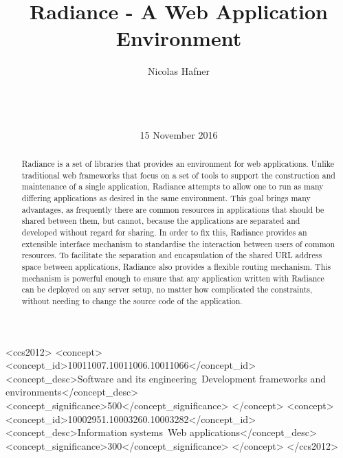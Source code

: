 \documentclass{sig-alternate}
\begin{document}
\doi{}
\isbn{}

\begin{CCSXML}
<ccs2012>
  <concept>
    <concept_id>10011007.10011006.10011066</concept_id>
    <concept_desc>Software and its engineering~Development frameworks and environments</concept_desc>
    <concept_significance>500</concept_significance>
  </concept>
  <concept>
    <concept_id>10002951.10003260.10003282</concept_id>
    <concept_desc>Information systems~Web applications</concept_desc>
    <concept_significance>300</concept_significance>
  </concept>
</ccs2012>
\end{CCSXML}


\title{Radiance - A Web Application Environment}

\author{
\alignauthor
Nicolas Hafner\\
       \\
       \\
       \\
}
\date{15 November 2016}

\maketitle

\begin{abstract}
  Radiance\cite{radiance} is a set of libraries that provides an environment for web applications. Unlike traditional web frameworks that focus on a set of tools to support the construction and maintenance of a single application, Radiance attempts to allow one to run as many differing applications as desired in the same environment. This goal brings many advantages, as frequently there are common resources in applications that should be shared between them, but cannot, because the applications are separated and developed without regard for sharing. In order to fix this, Radiance provides an extensible interface mechanism to standardise the interaction between users of common resources. To facilitate the separation and encapsulation of the shared URL address space between applications, Radiance also provides a flexible routing mechanism. This mechanism is powerful enough to ensure that any application written with Radiance can be deployed on any server setup, no matter how complicated the constraints, without needing to change the source code of the application.
\end{abstract}
\end{document}

